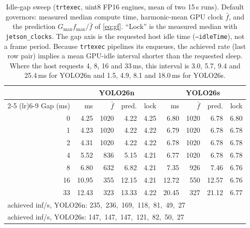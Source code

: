 \begin{table}[t]
\centering
\caption{Idle-gap sweep (\texttt{trtexec}, uint8 FP16 engines, mean of two
15\,s runs). Default governors: measured median compute time, harmonic-mean
GPU clock $\bar f$, and the prediction $G_{\max} f_{\max}/\bar f$ of
\cref{eq:gf}. ``Lock'' is the measured median with \texttt{jetson\_clocks}.
The gap axis is the requested host idle time (\texttt{--idleTime}), not a
frame period. Because \texttt{trtexec} pipelines its enqueues, the
achieved rate (last row pair) implies a mean GPU-idle interval shorter
than the requested sleep. Where the host requests 4, 8, 16 and 33\,ms,
this interval is 3.0, 5.7, 9.4 and 25.4\,ms for YOLO26n and 1.5, 4.9,
8.1 and 18.0\,ms for YOLO26s.}
\label{tab:dvfs}
\small
\setlength{\tabcolsep}{2.2pt}
\begin{tabular}{r rrrr rrrr}
\toprule
& \multicolumn{4}{c}{YOLO26n} & \multicolumn{4}{c}{YOLO26s} \\
\cmidrule(lr){2-5} \cmidrule(lr){6-9}
Gap (ms) & ms & $\bar f$ & pred. & lock & ms & $\bar f$ & pred. & lock \\
\midrule
0 & 4.25 & 1020 & 4.22 & 4.25 & 6.80 & 1020 & 6.78 & 6.80 \\
1 & 4.23 & 1020 & 4.22 & 4.22 & 6.79 & 1020 & 6.78 & 6.78 \\
2 & 4.31 & 1020 & 4.22 & 4.22 & 6.78 & 1020 & 6.78 & 6.78 \\
4 & 5.52 & 836 & 5.15 & 4.21 & 6.77 & 1020 & 6.78 & 6.78 \\
8 & 6.80 & 632 & 6.82 & 4.21 & 7.35 & 926 & 7.46 & 6.76 \\
16 & 10.95 & 355 & 12.15 & 4.21 & 12.72 & 550 & 12.57 & 6.76 \\
33 & 12.43 & 323 & 13.33 & 4.22 & 20.45 & 327 & 21.12 & 6.77 \\
\midrule
\multicolumn{9}{l}{achieved inf/s, YOLO26n: 235,\ 236,\ 169,\ 118,\ 81,\ 49,\ 27} \\
\multicolumn{9}{l}{achieved inf/s, YOLO26s: 147,\ 147,\ 147,\ 121,\ 82,\ 50,\ 27} \\
\bottomrule
\end{tabular}
\end{table}
